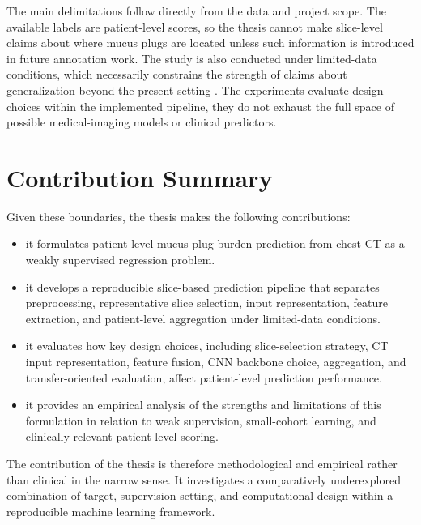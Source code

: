 The main delimitations follow directly from the data and project scope. The available labels are patient-level scores, so the thesis cannot make slice-level claims about where mucus plugs are located unless such information is introduced in future annotation work. The study is also conducted under limited-data conditions, which necessarily constrains the strength of claims about generalization beyond the present setting \cite{dhiman2023samplesize}. The experiments evaluate design choices within the implemented pipeline, they do not exhaust the full space of possible medical-imaging models or clinical predictors.


\section{Contribution Summary}

Given these boundaries, the thesis makes the following contributions:

\begin{itemize}
    \item it formulates patient-level mucus plug burden prediction from chest CT as a weakly supervised regression problem.
    
    \item it develops a reproducible slice-based prediction pipeline that separates preprocessing, representative slice selection, input representation, feature extraction, and patient-level aggregation under limited-data conditions.
    
    \item it evaluates how key design choices, including slice-selection strategy, CT input representation, feature fusion, CNN backbone choice, aggregation, and transfer-oriented evaluation, affect patient-level prediction performance.
    
    \item it provides an empirical analysis of the strengths and limitations of this formulation in relation to weak supervision, small-cohort learning, and clinically relevant patient-level scoring.
\end{itemize}

The contribution of the thesis is therefore methodological and empirical rather than clinical in the narrow sense. It investigates a comparatively underexplored combination of target, supervision setting, and computational design within a reproducible machine learning framework.


